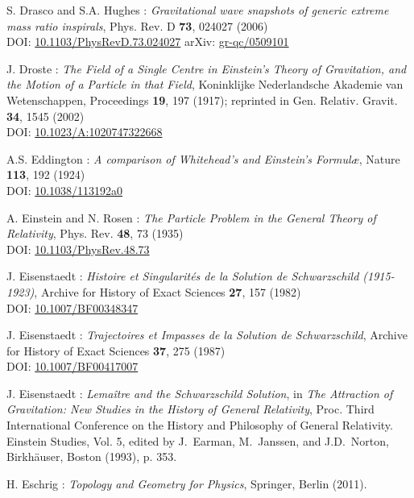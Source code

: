 \begin{thebibliography}{123}
S. Drasco and S.A. Hughes :
{\em Gravitational wave snapshots of generic extreme mass ratio inspirals},
Phys. Rev. D {\bf 73}, 024027 (2006)\\
DOI: \href{https://doi.org/10.1103/PhysRevD.73.024027}{10.1103/PhysRevD.73.024027}\hfill
arXiv: \href{https://arxiv.org/abs/gr-qc/0509101}{gr-qc/0509101}

J. Droste :
{\em The Field of a Single Centre in Einstein's Theory of Gravitation, and the Motion of a Particle in that Field},
Koninklijke Nederlandsche Akademie van Wetenschappen, Proceedings {\bf 19}, 197 (1917);
reprinted in Gen. Relativ. Gravit. {\bf 34}, 1545 (2002)\\
DOI: \href{https://doi.org/10.1023/A:1020747322668}{10.1023/A:1020747322668}

A.S. Eddington : {\em A comparison of Whitehead's and Einstein's Formul\ae},
Nature {\bf 113}, 192 (1924) \\
DOI: \href{https://doi.org/10.1038/113192a0}{10.1038/113192a0}

A. Einstein and N. Rosen :
{\em The Particle Problem in the General Theory of Relativity},
Phys. Rev. {\bf 48}, 73 (1935) \\
DOI: \href{https://doi.org/10.1103/PhysRev.48.73}{10.1103/PhysRev.48.73}

J. Eisenstaedt :
{\em Histoire et Singularit\'es de la Solution de Schwarzschild (1915-1923)},
Archive for History of Exact Sciences {\bf 27}, 157 (1982) \\
DOI: \href{https://doi.org/10.1007/BF00348347}{10.1007/BF00348347}

J. Eisenstaedt :
{\em Trajectoires et Impasses de la Solution de Schwarzschild},
Archive for History of Exact Sciences {\bf 37}, 275 (1987) \\
DOI: \href{https://doi.org/10.1007/BF00417007}{10.1007/BF00417007}

J. Eisenstaedt : {\em Lemaître and the Schwarzschild Solution}, in
{\em The Attraction of Gravitation: New Studies in the History of
General Relativity}, Proc. Third International Conference on the History and Philosophy of General Relativity. Einstein
Studies, Vol. 5, edited by J.~Earman, M.~Janssen, and J.D.~Norton,
Birkhäuser, Boston (1993), p. 353.

H. Eschrig : {\em Topology and Geometry for Physics},
Springer, Berlin (2011).


\end{thebibliography}
